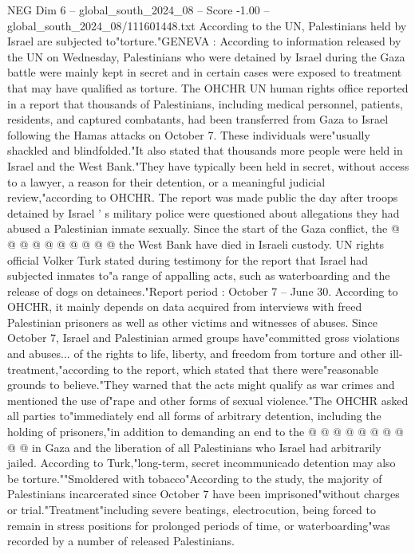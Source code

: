 \begin{textsample}{NEG Dim 6 – global\_south\_2024\_08 – Score -1.00 – global\_south\_2024\_08/111601448.txt}  \label{ex:f6_neg_133}
According to the UN, Palestinians held by Israel are subjected to"torture."GENEVA : According to information released by the UN on Wednesday, Palestinians who were detained by Israel during the Gaza battle were mainly kept in secret and in certain cases were exposed to treatment that may have qualified as torture.
The OHCHR UN human rights office reported in a report that thousands of Palestinians, including medical personnel, patients, residents, and captured combatants, had been transferred from Gaza to Israel following the Hamas attacks on October 7.
These individuals were"usually shackled and blindfolded."It also stated that thousands more people were held in Israel and the West Bank."They have typically been held in secret, without access to a lawyer, a reason for their detention, or a meaningful judicial review,"according to OHCHR.
The report was made public the day after troops detained by Israel ' s military police were questioned about allegations they had abused a Palestinian inmate sexually.
Since the start of the Gaza conflict, the @ @ @ @ @ @ @ @ @ @ the West Bank have died in Israeli custody.
UN rights official Volker Turk stated during testimony for the report that Israel had subjected inmates to"a range of appalling acts, such as waterboarding and the release of dogs on detainees."Report period : October 7 -- June 30.
According to OHCHR, it mainly depends on data acquired from interviews with freed Palestinian prisoners as well as other victims and witnesses of abuses.
Since October 7, Israel and Palestinian armed groups have"committed gross violations and abuses... of the rights to life, liberty, and freedom from torture and other ill-treatment,"according to the report, which stated that there were"reasonable grounds to believe."They warned that the acts might qualify as war crimes and mentioned the use of"rape and other forms of sexual violence."The OHCHR asked all parties to"immediately end all forms of arbitrary detention, including the holding of prisoners,"in addition to demanding an end to the @ @ @ @ @ @ @ @ @ @ in Gaza and the liberation of all Palestinians who Israel had arbitrarily jailed.
According to Turk,"long-term, secret incommunicado detention may also be torture.""Smoldered with tobacco"According to the study, the majority of Palestinians incarcerated since October 7 have been imprisoned"without charges or trial."Treatment"including severe beatings, electrocution, being forced to remain in stress positions for prolonged periods of time, or waterboarding"was recorded by a number of released Palestinians.

\end{textsample}
